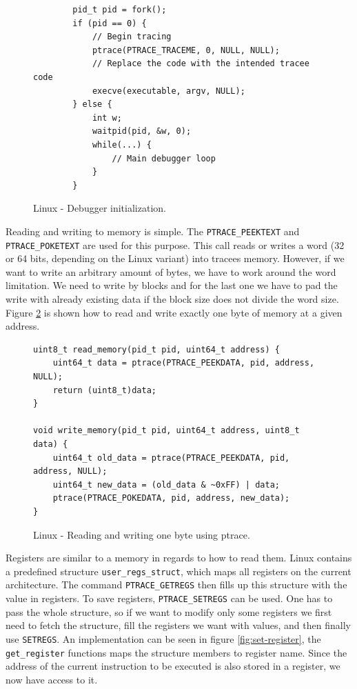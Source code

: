 \begin{figure}\label{fig:debugger-init}
    \begin{verbatim}
        pid_t pid = fork();
        if (pid == 0) {
            // Begin tracing
            ptrace(PTRACE_TRACEME, 0, NULL, NULL);
            // Replace the code with the intended tracee code
            execve(executable, argv, NULL);
        } else {
            int w;
            waitpid(pid, &w, 0);
            while(...) {
                // Main debugger loop
            }
        }
    \end{verbatim}
    \caption{Linux - Debugger initialization.}
\end{figure}

Reading and writing to memory is simple. The \texttt{PTRACE\_PEEKTEXT} and
\texttt{PTRACE\_POKETEXT} are used for this purpose. This call reads or writes
a word (32 or 64 bits, depending on the Linux variant) into tracees memory.
However, if we want to write an arbitrary amount of bytes, we have to work
around the word limitation. We need to write by blocks and for the last one we
have to pad the write with already existing data if the block size does not
divide the word size. Figure \ref{fig:write-read} is shown how to read and
write exactly one byte of memory at a given address.

\begin{figure}\label{fig:write-read}
    \begin{verbatim}
uint8_t read_memory(pid_t pid, uint64_t address) {
    uint64_t data = ptrace(PTRACE_PEEKDATA, pid, address, NULL);
    return (uint8_t)data;
}

void write_memory(pid_t pid, uint64_t address, uint8_t data) {
    uint64_t old_data = ptrace(PTRACE_PEEKDATA, pid, address, NULL);
    uint64_t new_data = (old_data & ~0xFF) | data;
    ptrace(PTRACE_POKEDATA, pid, address, new_data);
}
    \end{verbatim}
    \caption{Linux - Reading and writing one byte using ptrace.}
\end{figure}

Registers are similar to a memory in regards to how to read them. Linux
contains a predefined structure \texttt{user\_regs\_struct}, which maps all
registers on the current architecture. The command \texttt{PTRACE\_GETREGS}
then fills up this structure with the value in registers. To save registers,
\texttt{PTRACE\_SETREGS} can be used. One has to pass the whole structure, so
if we want to modify only some registers we first need to fetch the structure,
fill the registers we want with values, and then finally use \texttt{SETREGS}.
An implementation can be seen in figure \ref{fig:set-register}, the
\texttt{get\_register} functions maps the structure members to register name.
Since the address of the current instruction to be executed is also stored in a
register, we now have access to it.

